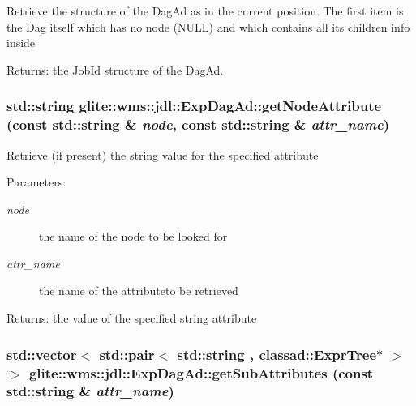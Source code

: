Retrieve the structure of the Dag\-Ad as in the current position. The first item is the Dag itself which has no node (NULL) and which contains all its children info inside \begin{Desc}
\item[Returns:]the Job\-Id structure of the Dag\-Ad. \end{Desc}
\hypertarget{classglite_1_1wms_1_1jdl_1_1ExpDagAd_a11}{
\subsubsection[getNodeAttribute]{\setlength{\rightskip}{0pt plus 5cm}std::string glite::wms::jdl::Exp\-Dag\-Ad::get\-Node\-Attribute (const std::string \& {\em node}, const std::string \& {\em attr\_\-name})}}
\label{classglite_1_1wms_1_1jdl_1_1ExpDagAd_a11}


Retrieve (if present) the string value for the specified attribute \begin{Desc}
\item[Parameters:]
\begin{description}
\item[{\em node}]the name of the node to be looked for \item[{\em attr\_\-name}]the name of the attributeto be retrieved \end{description}
\end{Desc}
\begin{Desc}
\item[Returns:]the value of the specified string attribute \end{Desc}
\hypertarget{classglite_1_1wms_1_1jdl_1_1ExpDagAd_a14}{
\subsubsection[getSubAttributes]{\setlength{\rightskip}{0pt plus 5cm}std::vector$<$ std::pair$<$ std::string , classad::Expr\-Tree$\ast$ $>$ $>$ glite::wms::jdl::Exp\-Dag\-Ad::get\-Sub\-Attributes (const std::string \& {\em attr\_\-name})}}
\label{classglite_1_1wms_1_1jdl_1_1ExpDagAd_a14}



